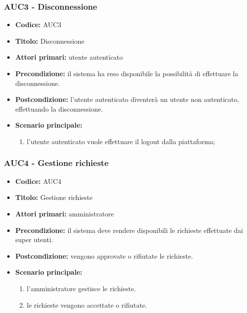 \documentclass[casi-duso]{subfiles}
\begin{document}
\subsubsection{AUC3 - Disconnessione}%
\label{subsub:AUC3}
\begin{itemize}
  \item \textbf{Codice:} AUC3
  \item \textbf{Titolo:} Disconnessione
  \item \textbf{Attori primari:} utente autenticato
  \item \textbf{Precondizione:} il sistema ha reso disponibile la possibilità di effettuare la disconnessione.
  \item \textbf{Postcondizione:} l'utente autenticato diventerà un utente non autenticato, effettuando la disconnessione.
  \item \textbf{Scenario principale:} 
  \begin{enumerate}
    \item l'utente autenticato vuole effettuare il logout dalla piattaforma;
  \end{enumerate}
\end{itemize}


\subsubsection{AUC4 - Gestione richieste}%
\label{subsub:AUC4}
\begin{itemize}
  \item \textbf{Codice:} AUC4
  \item \textbf{Titolo:} Gestione richieste
  \item \textbf{Attori primari:} amministratore
  \item \textbf{Precondizione:} il sistema deve rendere disponibili le richieste effettuate dai super utenti.
  \item \textbf{Postcondizione:} vengono approvate o rifiutate le richieste.
  \item \textbf{Scenario principale:} 
  \begin{enumerate}
    \item l'amministratore gestisce le richieste.
    \item le richieste vengono accettate o rifiutate.
  \end{enumerate}
\end{itemize}
\end{document}
